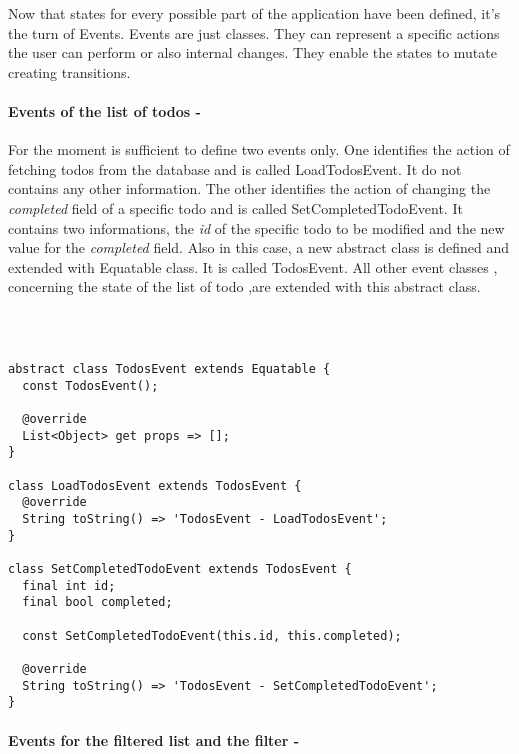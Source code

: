 Now that states for every possible part of the application have been defined, it’s the turn of Events. Events are just classes. They can represent a specific actions the user can perform or also internal changes. They enable the states to mutate creating transitions. 


\paragraph{Events of the list of todos - }
\label{subpar:todo_app_bloc_core_state}

For the moment is sufficient to define two events only. One identifies the action of fetching todos from the database and is called LoadTodosEvent. It do not contains any other information. The other identifies the action of changing the \textit{completed} field of a specific todo and is called SetCompletedTodoEvent. It contains two informations, the \textit{id} of the specific todo to be modified and the new value for the \textit{completed }field. 
Also in this case, a new abstract class is defined and extended with Equatable class. It is called TodosEvent. All other event classes , concerning the state of the list of todo ,are extended with this abstract class.
\begin{code}
\mbox{}\\
 \mbox{}
\label{code:2.14}
\begin{verbatim}

abstract class TodosEvent extends Equatable {
  const TodosEvent();

  @override
  List<Object> get props => [];
}

class LoadTodosEvent extends TodosEvent {
  @override
  String toString() => 'TodosEvent - LoadTodosEvent';
}

class SetCompletedTodoEvent extends TodosEvent {
  final int id;
  final bool completed;

  const SetCompletedTodoEvent(this.id, this.completed);

  @override
  String toString() => 'TodosEvent - SetCompletedTodoEvent';
}
\end{verbatim}
\mbox{}
\end{code}

\paragraph{Events for the filtered list and the filter - }
\label{subpar:todo_app_bloc_core_state}

